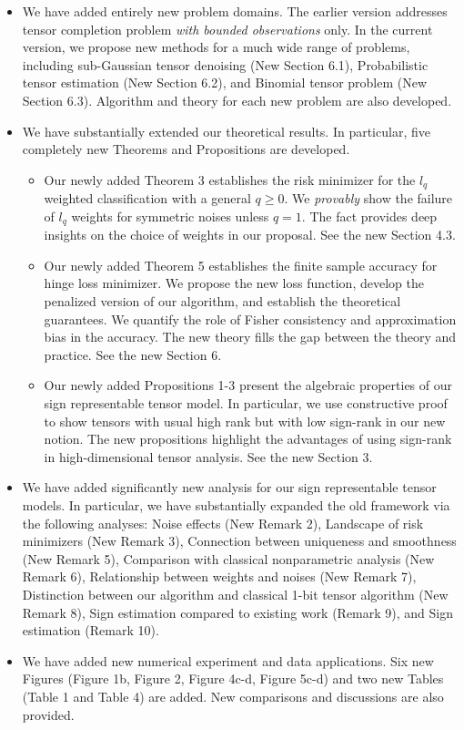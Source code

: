 \documentclass{article}
\begin{document}
\begin{itemize}
\item We have added entirely new problem domains. The earlier version addresses tensor completion problem \emph{with bounded observations} only. In the current version, we propose new methods for a much wide range of problems, including sub-Gaussian tensor denoising (New Section 6.1), Probabilistic tensor estimation (New Section 6.2), and Binomial tensor problem (New Section 6.3). Algorithm and theory for each new problem are also developed. 
\item We have substantially extended our theoretical results. In particular, five completely new Theorems and Propositions are developed. 
\begin{itemize}
\item Our newly added Theorem 3 establishes the risk minimizer for the $l_q$ weighted classification with a general $q\geq 0$. We \emph{provably} show the failure of $l_q$ weights for symmetric noises unless $q=1$. The fact provides deep insights on the choice of weights in our proposal. See the new Section 4.3.
\item Our newly added Theorem 5 establishes the finite sample accuracy for hinge loss minimizer. We propose the new loss function, develop the penalized version of our algorithm, and establish the theoretical guarantees. We quantify the role of Fisher consistency and approximation bias in the accuracy. The new theory fills the gap between the theory and practice. See the new Section 6. 

\item Our newly added Propositions 1-3 present the algebraic properties of our sign representable tensor model. In particular, we use constructive proof to show tensors with usual high rank but with low sign-rank in our new notion. The new propositions highlight the advantages of using sign-rank in high-dimensional tensor analysis. See the new Section 3. 
\end{itemize}
\item We have added significantly new analysis for our sign representable tensor models. In particular, we have substantially expanded the old framework via the following analyses: Noise effects (New Remark 2), Landscape of risk minimizers (New Remark 3), Connection between uniqueness and smoothness (New Remark 5), Comparison with classical nonparametric analysis (New Remark 6), Relationship between weights and noises (New Remark 7), Distinction between our algorithm and classical 1-bit tensor algorithm (New Remark 8), Sign estimation compared to existing work (Remark 9), and Sign estimation (Remark 10). 
\item We have added new numerical experiment and data applications. Six new Figures (Figure 1b, Figure 2, Figure 4c-d, Figure 5c-d) and two new Tables (Table 1 and Table 4) are added. New comparisons and discussions are also provided. 
\end{itemize}
\end{document}
